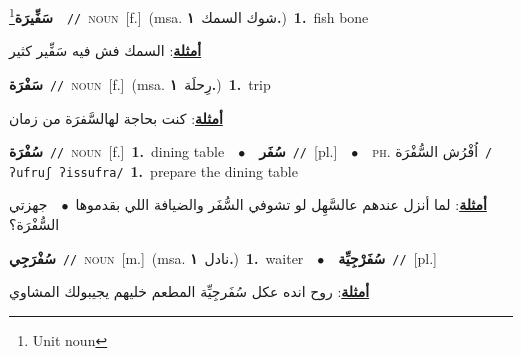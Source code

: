 \documentclass[10pt,a4paper,twoside]{article} %
\begin{document}
\begin{multicols}{2}
{\setlength\topsep{0pt}\textbf{\foreignlanguage{arabic}{سَفِّيرَة}}\footnote{Unit noun}\ \ {\color{gray}\texttt{//}\color{black}}\ \textsc{noun}\ [f.]\ \color{gray}(msa. \foreignlanguage{arabic}{شوك السمك}~\foreignlanguage{arabic}{\textbf{١.}})\color{black}\ \textbf{1.}~fish bone\  \begin{flushright}\color{gray}\foreignlanguage{arabic}{\textbf{\underline{\foreignlanguage{arabic}{أمثلة}}}: السمك فش فيه سَفِّير كثير}\end{flushright}\color{black}} \vspace{2mm}

{\setlength\topsep{0pt}\textbf{\foreignlanguage{arabic}{سَفْرَة}}\ {\color{gray}\texttt{//}\color{black}}\ \textsc{noun}\ [f.]\ \color{gray}(msa. \foreignlanguage{arabic}{رِحلَة}~\foreignlanguage{arabic}{\textbf{١.}})\color{black}\ \textbf{1.}~trip\  \begin{flushright}\color{gray}\foreignlanguage{arabic}{\textbf{\underline{\foreignlanguage{arabic}{أمثلة}}}: كنت بحاجة لهالسَّفرَة من زمان}\end{flushright}\color{black}} \vspace{2mm}

{\setlength\topsep{0pt}\textbf{\foreignlanguage{arabic}{سُفْرَة}}\ {\color{gray}\texttt{//}\color{black}}\ \textsc{noun}\ [f.]\ \textbf{1.}~dining table\ \ $\bullet$\ \ \setlength\topsep{0pt}\textbf{\foreignlanguage{arabic}{سُفَر}}\ {\color{gray}\texttt{//}\color{black}}\ [pl.]\ \ $\bullet$\ \ \textsc{ph.} \color{gray} \foreignlanguage{arabic}{اُفْرُش السُّفْرَة}\color{black}\ {\color{gray}\texttt{/{\sffamily ʔufruʃ ʔissufra}/}\color{black}}\ \textbf{1.}~prepare the dining table\  \begin{flushright}\color{gray}\foreignlanguage{arabic}{\textbf{\underline{\foreignlanguage{arabic}{أمثلة}}}: لما أنزل عندهم عالسَّهِل لو تشوفي السُّفَر والضيافة اللي بقدموها\ $\bullet$\ \  جهزتي السُّفْرَة؟}\end{flushright}\color{black}} \vspace{2mm}

{\setlength\topsep{0pt}\textbf{\foreignlanguage{arabic}{سُفْرَجِي}}\ {\color{gray}\texttt{//}\color{black}}\ \textsc{noun}\ [m.]\ \color{gray}(msa. \foreignlanguage{arabic}{نادل}~\foreignlanguage{arabic}{\textbf{١.}})\color{black}\ \textbf{1.}~waiter\ \ $\bullet$\ \ \setlength\topsep{0pt}\textbf{\foreignlanguage{arabic}{سُفَرْجِيِّة}}\ {\color{gray}\texttt{//}\color{black}}\ [pl.]\  \begin{flushright}\color{gray}\foreignlanguage{arabic}{\textbf{\underline{\foreignlanguage{arabic}{أمثلة}}}: روح انده عكل سُفَرجِيِّة المطعم خليهم يجيبولك المشاوي}\end{flushright}\color{black}} \vspace{2mm}


\end{multicols}
\end{document}
